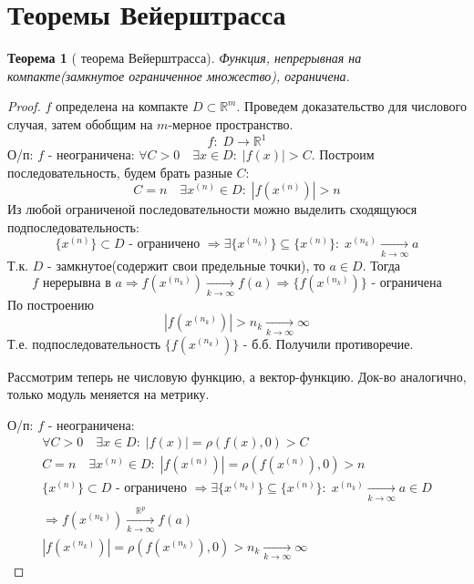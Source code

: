 \newcommand\RRR{\ensuremath{\mathbb{R}}}
\newcommand{\rom}[1]
    {\MakeUppercase{\romannumeral #1}}
\newtheorem{theorem}{Теорема}[section]
\theoremstyle{definition}
\newtheorem{definition}{Определение}[section]
\newpage
\section{Теоремы Вейерштрасса}
    
\begin{theorem}[\rom{1} теорема Вейерштрасса]
    Функция, непрерывная на компакте(замкнутое ограниченное множество), ограничена.
\end{theorem}

\begin{proof}
    $f$ определена на компакте $D \subset \RRR^m$. Проведем доказательство для числового случая, затем обобщим на $m$-мерное пространство.
    \[
        f:\; D \rightarrow \RRR^1
    \]
    О/п: $f$ - неограничена: $\forall C > 0 \quad \exists x \in D:\;|f(x)| > C$. 
    Построим последовательность, будем брать разные $C$:
    \[
        C=n \quad \exists x^{(n)} \in D:\; |f(x^{(n)})| > n
    \]
    Из любой ограниченой последовательности можно выделить сходящуюся подпоследовательность:
    \[
        \{x^{(n)}\} \subset D\text{ - ограничено }\Rightarrow \exists \{ x^{(n_k)} \} \subseteq \{x^{(n)}\}:\; x^{(n_k)} \xrightarrow[k \rightarrow \infty]{} a
    \]
    Т.к. $D$ - замкнутое(содержит свои предельные точки), то $a \in D$. Тогда
    \[
        f \text{ нерерывна в } a \Rightarrow f(x^{(n_k)}) \xrightarrow[k \rightarrow \infty]{} f(a) \Rightarrow \{f(x^{(n_k)})\} \text{ - ограничена} 
    \]
    По построению 
    \[
        |f(x^{(n_k)})| > n_k  \xrightarrow[k \rightarrow \infty]{} \infty
    \]
    Т.е. подпоследовательность $\{f(x^{(n_k)})\}$ - б.б. Получили противоречие. 
        
    Рассмотрим теперь не числовую функцию, а вектор-функцию.
    Док-во аналогично, только модуль меняется на метрику.

    О/п: $f$ - неограничена:
    \begin{gather*}
        \forall C > 0 \quad \exists x \in D:\;|f(x)| = \rho(f(x), 0) > C\\
        C=n \quad \exists x^{(n)} \in D:\; |f(x^{(n)})| = \rho(f(x^{(n)}), 0) > n\\
        \{x^{(n)}\} \subset D\text{ - ограничено }\Rightarrow \exists \{ x^{(n_k)} \} \subseteq \{x^{(n)}\}:\; x^{(n_k)} \xrightarrow[k \rightarrow \infty]{} a \in D\\
        \Rightarrow f(x^{(n_k)}) \xrightarrow[k \rightarrow \infty]{\RRR^p} f(a)\\
        |f(x^{(n_k)})| = \rho(f(x^{(n_k)}), 0) > n_k  \xrightarrow[k \rightarrow \infty]{} \infty
    \end{gather*}

\end{proof}

